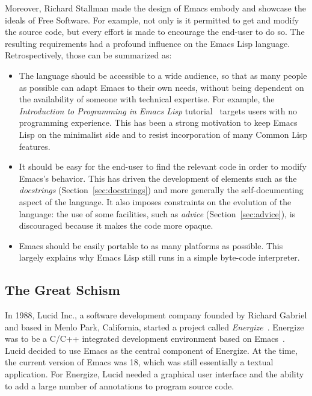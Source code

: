 \documentclass[format=acmsmall,screen]{acmart}
\newcommand \Elisp {Emacs Lisp}
\begin{document}
Moreover, Richard Stallman made the design of Emacs embody and showcase
the ideals of Free Software.  For example, not only is it permitted to get
and modify the source code, but every effort is made to encourage the
end-user to do so.  The resulting requirements had a profound influence on
the \Elisp{} language.  Retrospectively, those
can be summarized as:
\begin{itemize}
\item The language should be accessible to a wide audience, so that as many
  people as possible can adapt Emacs to their own needs, without being
  dependent on the availability of someone with technical expertise.
  For example, the
  \emph{Introduction to Programming in Emacs Lisp}
  tutorial~\citep{ElispIntro} targets users with no programming
  experience.  This has been a strong motivation to keep \Elisp{} on the
  minimalist side and to resist incorporation of many Common Lisp features.
\item It should be easy for the end-user to find the relevant code in order
  to modify Emacs's behavior.  This has driven the development of elements
  such as the \emph{docstrings} (Section~\ref{sec:docstrings}) and more generally the self-documenting
  aspect of the language.  It also imposes constraints on the evolution of
  the language: the use of some facilities, such as \emph{advice}
  (Section~\ref{sec:advice}), is
  discouraged because it makes the code more opaque.
\item Emacs should be easily portable to as many platforms as possible.
  This largely explains why \Elisp{} still runs in a simple byte-code interpreter.
\end{itemize}

\subsection{The Great Schism}
\label{sec:schism}
\label{sec:energize}
In 1988, Lucid Inc., a software development company founded by Richard
Gabriel and based in Menlo
Park, California, started a project called \emph{Energize}~\cite{GabrielEtAl1990,Gabriel-personal}.
Energize was to be a C/C++ integrated development environment based on
Emacs~\cite{GabrielLetter}.  Lucid decided to use Emacs as the central
component of Energize.  At the time, the current version of Emacs was
18, which was still essentially a textual application.
For Energize, Lucid needed a graphical user
interface and the ability to add a large number of annotations to
program source code.
\end{document}
